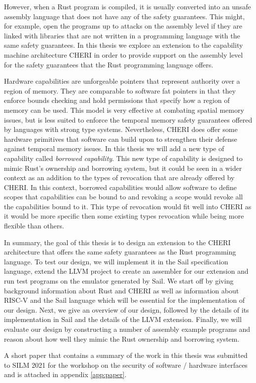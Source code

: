 However, when a Rust program is compiled, it is usually converted into an unsafe assembly language that does not have any of the safety guarantees.
This might, for example, open the programs up to attacks on the assembly level if they are linked with libraries that are not written in a programming language with the same safety guarantees.
In this thesis we explore an extension to the capability machine architecture CHERI in order to provide support on the assembly level for the safety guarantees that the Rust programming language offers.

Hardware capabilities are unforgeable pointers that represent authority over a region of memory.
They are comparable to software fat pointers in that they enforce bounds checking and hold permissions that specify how a region of memory can be used.
This model is very effective at combating spatial memory issues, but is less suited to enforce the temporal memory safety guarantees offered by languages with strong type systems.
Nevertheless, CHERI does offer some hardware primitives that software can build upon to strengthen their defense against temporal memory issues.
In this thesis we will add a new type of capability called \textit{borrowed capability}.
This new type of capability is designed to mimic Rust's ownership and borrowing system, but it could be seen in a wider context as an addition to the types of revocation that are already offered by CHERI.
In this context, borrowed capabilities would allow software to define scopes that capabilities can be bound to and revoking a scope would revoke all the capabilities bound to it.
This type of revocation would fit well into CHERI as it would be more specific then some existing types revocation while being more flexible than others.

In summary, the goal of this thesis is to design an extension to the CHERI architecture that offers the same safety guarantees as the Rust programming language.
To test our design, we will implement it in the Sail specification language, extend the LLVM project to create an assembler for our extension and run test programs on the emulator generated by Sail.
We start off by giving background information about Rust and CHERI as well as information about RISC-V and the Sail language which will be essential for the implementation of our design.
Next, we give an overview of our design, followed by the details of its implementation in Sail and the details of the LLVM extension.
Finally, we will evaluate our design by constructing a number of assembly example programs and reason about how well they mimic the Rust ownership and borrowing system.

A short paper that contains a summary of the work in this thesis was submitted to SILM 2021 for the workshop on the security of software / hardware interfaces and is attached in appendix \ref{app:paper}.

